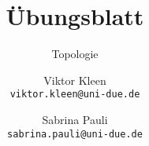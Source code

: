 \title{Übungsblatt \theSheet}
\subtitle{Topologie}
\author{\normalsize Viktor Kleen \\[-1ex] \texttt{\footnotesize viktor.kleen@uni-due.de} %
   \and \normalsize Sabrina Pauli \\[-1ex] \texttt{\footnotesize sabrina.pauli@uni-due.de}}
\date{}
